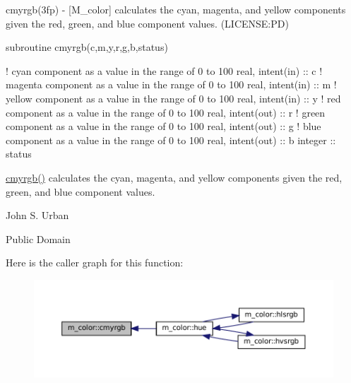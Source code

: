 \begin{DoxyDescription}
\item[\label{_CMYRGB}%
N\+A\+ME ]cmyrgb(3fp) -\/ \mbox{[}M\+\_\+color\mbox{]} calculates the cyan, magenta, and yellow components given the red, green, and blue component values. (L\+I\+C\+E\+N\+SE\+:PD) 


\item[S\+Y\+N\+O\+P\+S\+IS ]
\begin{DoxyPre}
    subroutine cmyrgb(c,m,y,r,g,b,status)\end{DoxyPre}



\begin{DoxyPre}     ! cyan component as a value in the range of 0 to 100
     real, intent(in)  :: c
     ! magenta component as a value in the range of 0 to 100
     real, intent(in)  :: m
     ! yellow component as a value in the range of 0 to 100
     real, intent(in)  :: y
     ! red component as a value in the range of 0 to 100
     real, intent(out) :: r
     ! green component as a value in the range of 0 to 100
     real, intent(out) :: g
     ! blue component as a value in the range of 0 to 100
     real, intent(out) :: b
     integer           :: status
    \end{DoxyPre}
 


\item[D\+E\+S\+C\+R\+I\+P\+T\+I\+ON ]\mbox{\hyperlink{namespacem__color_ab91687e87d0901874e52efe5933e3044}{cmyrgb()}} calculates the cyan, magenta, and yellow components given the red, green, and blue component values.




\item[A\+U\+T\+H\+OR ]

John S. Urban




\item[L\+I\+C\+E\+N\+SE ]

Public Domain




\end{DoxyDescription}Here is the caller graph for this function\+:
\nopagebreak
\begin{figure}[H]
\begin{center}
\leavevmode
\includegraphics[width=350pt]{namespacem__color_ab91687e87d0901874e52efe5933e3044_icgraph}
\end{center}
\end{figure}
\mbox{\label{namespacem__color_a84a36043d278bc56a7148483a862dec8}} 
